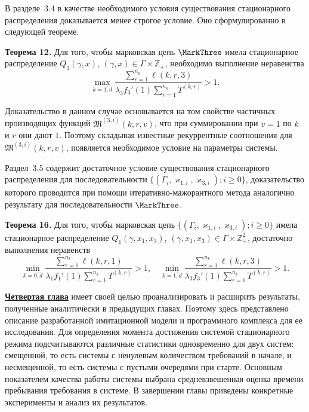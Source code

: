В разделе~3.4 в качестве необходимого условия существования стационарного распределения доказывается менее строгое условие. Оно сформулированно в следующей теореме.

\textbf{Теорема 12.}
Для того,  чтобы марковская цепь $\MarkThree$ имела стационарное распределение $Q_3(\gamma, x)$,  $(\gamma, x)\in \Gamma \times {\mathbb Z}_+$,  необходимо выполнение неравенства
$$
\max_{k=\overline{1, d}} { \frac{\sum_{r = 1}^{n_{k}}\ell(k, r, 3)}{\lambda_3 f_3'(1) \sum_{r = 1}^{n_k} T^{(k, r)}} } >1.
$$

Доказательство в данном случае основывается на том свойстве частичных производящих функций $\mathfrak{M}^{(3, i)}(k, r, v)$, что при суммировании при $v=1$ по $k$ и $r$ они дают $1$. Поэтому складывая известные рекуррентные соотношения для $\mathfrak{M}^{(3, i)}(k, r, v)$, появляется необходимое условие на параметры системы.

Раздел~3.5 содержит достаточное условие существования стационарного распределения для последовательности $\{(\Gamma_i,  \varkappa_{1, i}, \varkappa_{3, i}); i \geqslant 0\}$, доказательство которого проводится при помощи итеративно-мажорантного метода аналогично результату для последовательности $\MarkThree$.

\textbf{Теорема 16.}
Для того,  чтобы марковская цепь $\{(\Gamma_i,  \varkappa_{1, i}, \varkappa_{3, i}); i \geqslant 0\}$ имела стационарное распределение $Q_1(\gamma, x_1, x_3)$,  $(\gamma, x_1, x_3)\in \Gamma \times {\mathbb Z}^2_+$,  достаточно выполнения неравенств
\begin{equation}
\min_{k=\overline{0, d}} { \frac{\sum_{r = 1}^{n_k} \ell(k, r, 1) }{\lambda_1 f_1'(1) \sum_{r=1}^{n_k} T^{(k, r)} }}>1,  \quad 
\min_{k=\overline{1, d}} { \frac{\sum_{r = 1}^{n_k} \ell(k, r, 3) }{\lambda_3 f_3'(1) \sum_{r=1}^{n_k} T^{(k, r)} }}>1.
\end{equation}


 \underline{\textbf{Четвертая глава}} имеет своей целью проанализировать и расширить результаты, полученные аналитически в предыдущих главах. Поэтому здесь представлено описание разработанной имитационной модели и программного комплекса для ее исследования. Для определения момента достижения системой стационарного режима подсчитываются различные статистики одновременно для двух систем: смещенной, то есть системы с ненулевым количеством требований в начале, и несмещенной, то есть системы с пустыми очередями при старте. Основным показателем качества работы системы выбрана средневзвешенная оценка времени пребывания требования в системе. В завершении главы приведены конкретные эксперименты и анализ их результатов.





